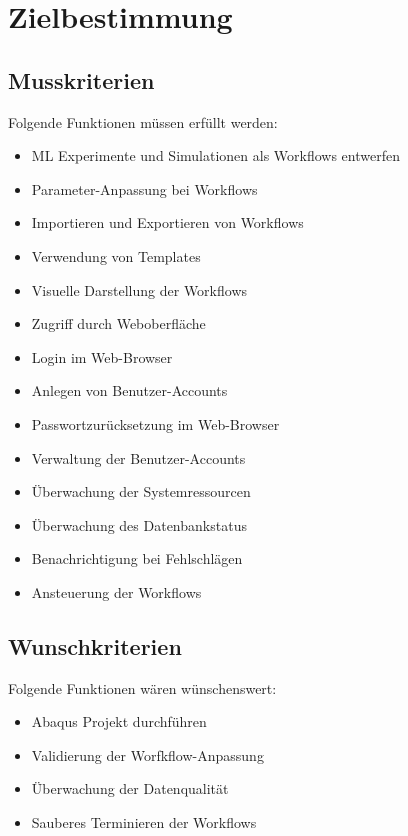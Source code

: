 \section{Zielbestimmung}


\subsection{Musskriterien}
    Folgende Funktionen müssen erfüllt werden:
    \begin{itemize}
        \item \label{/M10/} ML Experimente und Simulationen als Workflows entwerfen
        \item \label{/M20/} Parameter-Anpassung bei Workflows
        \item \label{/M30/} Importieren und Exportieren von Workflows
        \item \label{/M40/} Verwendung von Templates
        \item \label{/M50/} Visuelle Darstellung der Workflows
        \item \label{/M60/} Zugriff durch Weboberfläche
        \item \label{/M70/} Login im Web-Browser
        \item \label{/M80/} Anlegen von Benutzer-Accounts
        \item \label{/M90/} Passwortzurücksetzung im Web-Browser
        \item \label{/M100/} Verwaltung der Benutzer-Accounts
        \item \label{/M110/} Überwachung der Systemressourcen
        \item \label{/M120/} Überwachung des Datenbankstatus
        \item \label{/M130/} Benachrichtigung bei Fehlschlägen
        \item \label{/M140/} Ansteuerung der Workflows 
    \end{itemize}
        
        
\subsection{Wunschkriterien}
    Folgende Funktionen wären wünschenswert:
    \begin{itemize}
        \item \label{/W10/} Abaqus Projekt durchführen
        \item \label{/W20/} Validierung der Worfkflow-Anpassung
        \item \label{/W30/} Überwachung der Datenqualität
        \item \label{/W40/} Sauberes Terminieren der Workflows
    \end{itemize}


